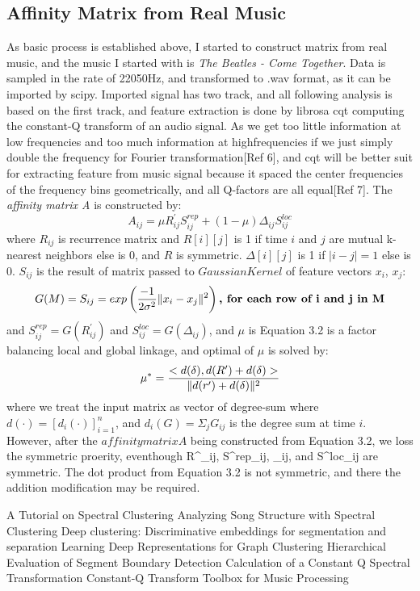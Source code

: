 \documentclass[final]{siamltexmm}
\begin{document}
\subsection{Affinity Matrix from Real Music}
As basic process is established above, I started to construct matrix from real music, and the music I started with is \textit{The Beatles - Come Together}. Data is sampled in the rate of 22050Hz, and transformed to .wav format, as it can be imported by scipy. Imported signal has two track, and all following analysis is based on the first track, and feature extraction is done by librosa cqt computing the constant-Q transform of an audio signal. As we get too little information at low frequencies and too much information at highfrequencies if we just simply double the frequency for Fourier transformation[Ref 6], and cqt will be better suit for extracting feature from music signal because it spaced the center frequencies of the frequency bins geometrically, and all Q-factors are all equal[Ref 7]. The \textit{ affinity matrix A} is constructed by:
\begin{equation}
A_{ij} = \mu R^{\prime}_{ij}S^{rep}_{ij} + (1-\mu)\Delta_{ij}S^{loc}_{ij}
\end{equation}
where $R_{ij}$ is recurrence matrix and $R[i][j]$ is 1 if time $i$ and $j$ are mutual k-nearest neighbors else is 0, and $R$ is symmetric. $\Delta[i][j]$ is 1 if $|i-j|=1$ else is 0. $S_{ij}$ is the result of matrix passed to $Gaussian Kernel$ of feature vectors $x_i$, $x_j$:
\begin{equation}
G(M) = S_{ij} = exp\left( {-1\over2\sigma^2} \|x_i-x_j\|^2  \right) \textbf{, for each row of i and j in M}
\end{equation}
and $S^{rep}_{ij} = G(R^{\prime}_{ij})$ and $S^{loc}_{ij} = G(\Delta_{ij})$, and $\mu$ is Equation 3.2 is a factor balancing local and global linkage, and optimal of $\mu$ is solved by:
\begin{equation}
\mu^{\ast} = {<d(\delta), d(R^{\prime})+d(\delta) >\over \|d(r^{\prime})+d(\delta)\|^2}
\end{equation}
where we treat the input matrix as vector of degree-sum where $d(\cdot)=[d_i(\cdot)]^n_{i=1}$, and $d_i(G) = \Sigma_jG_{ij}$ is the degree sum at time $i$. However, after the $affinity matrix A$ being constructed from Equation 3.2, we loss the symmetric proerity, eventhough R^{\prime}_{ij}, S^{rep}_{ij}, \Delta_{ij}, and S^{loc}_{ij} are symmetric. The dot product from Equation 3.2 is not symmetric, and there the addition modification may be required.


\begin{thebibliography}{10}
 {\sc A Tutorial on Spectral Clustering}
 {\sc Analyzing Song Structure with Spectral Clustering}
 {\sc Deep clustering: Discriminative embeddings for
segmentation and separation}
 {\sc Learning Deep Representations for Graph Clustering}
 {\sc Hierarchical Evaluation of Segment Boundary Detection}
 {\sc Calculation of a Constant Q Spectral Transformation}
 {\sc Constant-Q Transform Toolbox for Music Processing}
\end{thebibliography}
\end{document}

